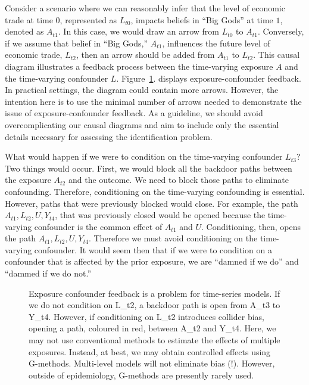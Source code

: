 \documentclass[
  singlecolumn]{article}
\begin{document}
Consider a scenario where we can reasonably infer that the level of
economic trade at time \(0\), represented as \(L_{t0}\), impacts beliefs
in ``Big Gods'' at time \(1\), denoted as \(A_{t1}\). In this case, we
would draw an arrow from \(L_{t0}\) to \(A_{t1}\). Conversely, if we
assume that belief in ``Big Gods,'' \(A_{t1}\), influences the future
level of economic trade, \(L_{t2}\), then an arrow should be added from
\(A_{t1}\) to \(L_{t2}\). This causal diagram illustrates a feedback
process between the time-varying exposure \(A\) and the time-varying
confounder \(L\). Figure~\ref{fig-dag-9}. displays exposure-confounder
feedback. In practical settings, the diagram could contain more arrows.
However, the intention here is to use the minimal number of arrows
needed to demonstrate the issue of exposure-confounder feedback. As a
guideline, we should avoid overcomplicating our causal diagrams and aim
to include only the essential details necessary for assessing the
identification problem.

What would happen if we were to condition on the time-varying confounder
\(L_{t3}\)? Two things would occur. First, we would block all the
backdoor paths between the exposure \(A_{t2}\) and the outcome. We need
to block those paths to eliminate confounding. Therefore, conditioning
on the time-varying confounding is essential. However, paths that were
previously blocked would close. For example, the path
\(A_{t1}, L_{t2}, U, Y_{t4}\), that was previously closed would be
opened because the time-varying confounder is the common effect of
\(A_{t1}\) and \(U\). Conditioning, then, opens the path
\(A_{t1}, L_{t2}, U, Y_{t4}\). Therefore we must avoid conditioning on
the time-varying confounder. It would seem then that if we were to
condition on a confounder that is affected by the prior exposure, we are
``damned if we do'' and ``dammed if we do not.''

\begin{figure}


\caption{\label{fig-dag-9}Exposure confounder feedback is a problem for
time-series models. If we do not condition on L\_t2, a backdoor path is
open from A\_t3 to Y\_t4. However, if conditioning on L\_t2 introduces
collider bias, opening a path, coloured in red, between A\_t2 and Y\_t4.
Here, we may not use conventional methods to estimate the effects of
multiple exposures. Instead, at best, we may obtain controlled effects
using G-methods. Multi-level models will not eliminate bias (!).
However, outside of epidemiology, G-methods are presently rarely used.}

\end{figure}%
\end{document}
